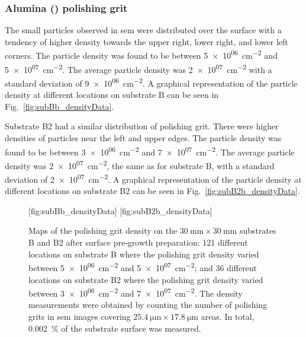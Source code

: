 \subsubsection{Alumina () polishing grit}



The small particles observed in \ac{sem} were distributed over the surface with a tendency of higher density towards the upper right, lower right, and lower left corners. The particle density was found to be between \SI{5e+06}{\centi\metre^{-2}} and \SI{5e+07}{\centi\metre^{-2}}. The average particle density was \SI{2e+07}{\centi\metre^{-2}} with a standard deviation of \SI{9e+06}{\centi\metre^{-2}}. A graphical representation of the particle density at different locations on substrate B can be seen in Fig.~\ref{fig:subBb_densityData}.

Substrate B2 had a similar distribution of polishing grit. There were higher densities of particles near the left and upper edges. The particle density was found to be between \SI{3e+06}{\centi\metre^{-2}} and \SI{7e+07}{\centi\metre^{-2}}. The average particle density was \SI{2e+07}{\centi\metre^{-2}}, the same as for substrate B, with a standard deviation of \SI{2e+07}{\centi\metre^{-2}}. A graphical representation of the particle density at different locations on substrate B2 can be seen in Fig.~\ref{fig:subB2b_densityData}.

\begin{figure}[htbp]
    \centering
    [fig:subBb_densityData]
    \hfill
    [fig:subB2b_densityData]
    \caption[Maps of the polishing grit density on substrates B and B2 after surface pre-growth preparation.]{Maps of the polishing grit density on the $\SI{30}{\milli\metre}\times\SI{30}{\milli\metre}$ substrates B and B2 after surface pre-growth preparation:  121 different locations on substrate B where the polishing grit density varied between \SI{5e+06}{\centi\metre^{-2}} and \SI{5e+07}{\centi\metre^{-2}}; and  36 different locations on substrate B2 where the polishing grit density varied between \SI{3e+06}{\centi\metre^{-2}} and \SI{7e+07}{\centi\metre^{-2}}. The density measurements were obtained by counting the number of polishing grits in \ac{sem} images covering $\SI{25.4}{\micro\metre}\times\SI{17.8}{\micro\metre}$ areas. In total, \SI{0.002}{\percent} of the substrate surface was measured.}
    \label{fig:subBb_and_subB2b_densityData}
\end{figure}

